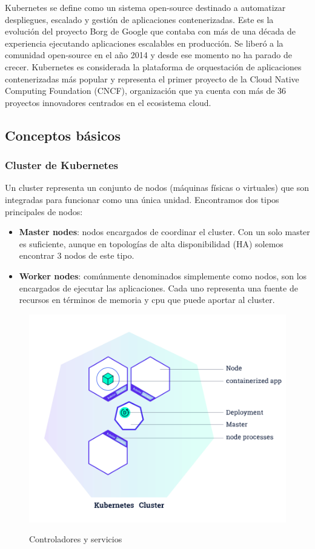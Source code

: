 \documentclass[spanish,twoside,12pt,a4paper]{book}
\begin{document}
Kubernetes\citep{kubernetes} se define como un sistema open-source destinado a automatizar despliegues, escalado y
gestión de aplicaciones contenerizadas. Este es la evolución del proyecto Borg de Google que contaba
con más de una década de experiencia ejecutando aplicaciones escalables en producción. Se liberó a la
comunidad open-source en el año 2014 y desde ese momento no ha parado de crecer.
Kubernetes es considerada la plataforma de orquestación de aplicaciones contenerizadas más popular y
representa el primer proyecto de la Cloud Native Computing Foundation (CNCF), organización que ya
cuenta con más de 36 proyectos innovadores centrados en el ecosistema cloud.

\subsection{Conceptos básicos}

\subsubsection{Cluster de Kubernetes}

Un cluster representa un conjunto de nodos (máquinas físicas o virtuales) que son integradas para
funcionar como una única unidad. Encontramos dos tipos principales de nodos:
\begin{itemize}
	\item \textbf{Master nodes}: nodos encargados de coordinar el cluster. Con un solo master es suficiente,
	aunque en topologías de alta disponibilidad (HA) solemos encontrar 3 nodos de este tipo.
	\item \textbf{Worker nodes}: comúnmente denominados simplemente como nodos, son los encargados de
	ejecutar las aplicaciones. Cada uno representa una fuente de recursos en términos de memoria y
	cpu que puede aportar al cluster.
\end{itemize}

\begin{figure}
    \centering
	\includegraphics[scale=0.6]{img/module_02_first_app.png}
	\label{fig:controller}
	\caption{Controladores y servicios}
\end{figure}
\end{document}
